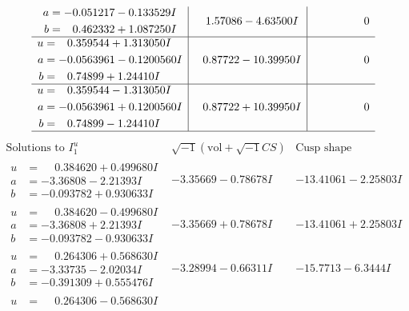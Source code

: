 \documentclass[1p]{elsarticle_modified}
\theoremstyle{definition}
\newcommand{\I}{\sqrt{-1}}
\begin{document}
$$\begin{array}{c|c|c}
\begin{aligned}
a &= -0.051217 - 0.133529 I \\
b &= \phantom{-}0.462332 + 1.087250 I\end{aligned}
 & \phantom{-}1.57086 - 4.63500 I & \phantom{-0.000000 } 0 \\ \hline\begin{aligned}
u &= \phantom{-}0.359544 + 1.313050 I \\
a &= -0.0563961 - 0.1200560 I \\
b &= \phantom{-}0.74899 + 1.24410 I\end{aligned}
 & \phantom{-}0.87722 - 10.39950 I & \phantom{-0.000000 } 0 \\ \hline\begin{aligned}
u &= \phantom{-}0.359544 - 1.313050 I \\
a &= -0.0563961 + 0.1200560 I \\
b &= \phantom{-}0.74899 - 1.24410 I\end{aligned}
 & \phantom{-}0.87722 + 10.39950 I & \phantom{-0.000000 } 0\\
 \hline 
 \end{array}$$\newpage$$\begin{array}{c|c|c}  
\text{Solutions to }I^u_{1}& \I (\text{vol} + \sqrt{-1}CS) & \text{Cusp shape}\\
 \hline 
\begin{aligned}
u &= \phantom{-}0.384620 + 0.499680 I \\
a &= -3.36808 - 2.21393 I \\
b &= -0.093782 + 0.930633 I\end{aligned}
 & -3.35669 - 0.78678 I & -13.41061 - 2.25803 I \\ \hline\begin{aligned}
u &= \phantom{-}0.384620 - 0.499680 I \\
a &= -3.36808 + 2.21393 I \\
b &= -0.093782 - 0.930633 I\end{aligned}
 & -3.35669 + 0.78678 I & -13.41061 + 2.25803 I \\ \hline\begin{aligned}
u &= \phantom{-}0.264306 + 0.568630 I \\
a &= -3.33735 - 2.02034 I \\
b &= -0.391309 + 0.555476 I\end{aligned}
 & -3.28994 - 0.66311 I & -15.7713 - 6.3444 I \\ \hline\begin{aligned}
u &= \phantom{-}0.264306 - 0.568630 I \\

\end{aligned}
\end{array}$$
\end{document}
